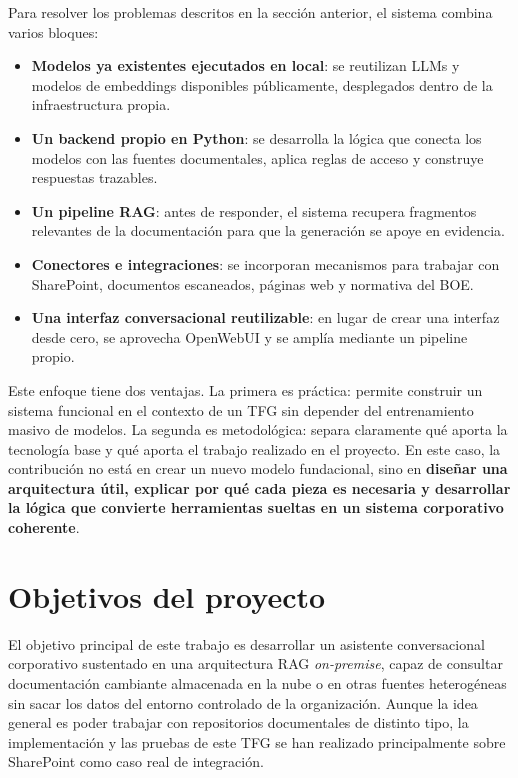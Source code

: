 Para resolver los problemas descritos en la sección anterior, el sistema combina varios bloques:

\begin{itemize}
    \item \textbf{Modelos ya existentes ejecutados en local}: se reutilizan LLMs y modelos de embeddings disponibles públicamente, desplegados dentro de la infraestructura propia.
    \item \textbf{Un backend propio en Python}: se desarrolla la lógica que conecta los modelos con las fuentes documentales, aplica reglas de acceso y construye respuestas trazables.
    \item \textbf{Un pipeline RAG}: antes de responder, el sistema recupera fragmentos relevantes de la documentación para que la generación se apoye en evidencia.
    \item \textbf{Conectores e integraciones}: se incorporan mecanismos para trabajar con SharePoint, documentos escaneados, páginas web y normativa del BOE.
    \item \textbf{Una interfaz conversacional reutilizable}: en lugar de crear una interfaz desde cero, se aprovecha OpenWebUI y se amplía mediante un pipeline propio.
\end{itemize}

Este enfoque tiene dos ventajas. La primera es práctica: permite construir un sistema funcional en el contexto de un TFG sin depender del entrenamiento masivo de modelos. La segunda es metodológica: separa claramente qué aporta la tecnología base y qué aporta el trabajo realizado en el proyecto. En este caso, la contribución no está en crear un nuevo modelo fundacional, sino en \textbf{diseñar una arquitectura útil, explicar por qué cada pieza es necesaria y desarrollar la lógica que convierte herramientas sueltas en un sistema corporativo coherente}.

\section{Objetivos del proyecto}
\label{sec:objetivos}

El objetivo principal de este trabajo es desarrollar un asistente conversacional corporativo sustentado en una arquitectura RAG \textit{on-premise}, capaz de consultar documentación cambiante almacenada en la nube o en otras fuentes heterogéneas sin sacar los datos del entorno controlado de la organización. Aunque la idea general es poder trabajar con repositorios documentales de distinto tipo, la implementación y las pruebas de este TFG se han realizado principalmente sobre SharePoint como caso real de integración.

